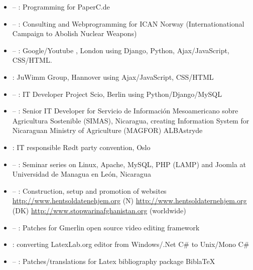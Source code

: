 \begin{itemize}
\item {} – : Programming for PaperC.de

\item {} – : Consulting and Webprogramming for ICAN Norway (Internationational Campaign to Abolish Nuclear Weapons)
\item {} – : Google/Youtube \UK, London using Django, Python, Ajax/JavaScript, CSS/HTML.
\item {}: JuWimm Group, Hannover using Ajax/JavaScript, CSS/HTML
\item {} – : IT Developer Project Scio, Berlin using Python/Django/MySQL
\item {} – : Senior IT Developer for Servicio de Información Mesoamericano sobre Agricultura Sostenible (SIMAS), Nicaragua, creating  Information System for Nicaraguan Ministry of Agriculture (MAGFOR) ALBAstryde
\item {}: IT responsible Rødt party convention, Oslo
\item {} – : Seminar series on Linux, Apache, MySQL, PHP (LAMP) and Joomla at Universidad de Managua en León, Nicaragua
\item {} – : Construction, setup and promotion of websites \href{http://www.hentsoldatenehjem.org}{http://www.hentsoldatenehjem.org} (N) \href{http://www.hentsoldaternehjem.org}{http://www.hentsoldaternehjem.org} (DK) \href{http://www.stopwarinafghanistan.org}{http://www.stopwarinafghanistan.org} (worldwide)
\item {} – : Patches for Gmerlin open source video editing framework
\item {}: converting LatexLab.org editor from Windows/.Net C\# to Unix/Mono C\#
\item {} – : Patches/translations for Latex bibliography package BiblaTeX


\end{itemize}
